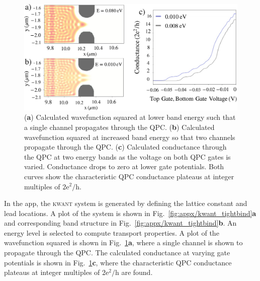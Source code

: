 \begin{figure}[!bht]
 \begin{center}
 \includegraphics[width=1.0\textwidth]{figures/appendix/appendix2_wavefunction.pdf}
 \caption[\textsc{kwant} : Transport Simulation]{\label{fig:appx/kwant_transport} 
 (\textbf{a}) Calculated wavefunction squared at lower band energy such that a single channel propagates through the QPC. (\textbf{b}) Calculated wavefunction squared at increased band energy so that two channels propagate through the QPC. (\textbf{c}) Calculated conductance through the QPC at two energy bands as the voltage on both QPC gates is varied. Conductance drops to zero at lower gate potentials. Both curves show the characteristic QPC conductance plateaus at integer multiples of $\mathrm{2e^2/h}$. }
 \end{center}
\end{figure}


In the app, the \textsc{kwant} system is generated by defining the lattice constant and lead locations. A plot of the system is shown in Fig.~\ref{fig:appx/kwant_tightbind}\textbf{a} and corresponding band structure in Fig.~\ref{fig:appx/kwant_tightbind}\textbf{b}. An energy level is selected to compute transport properties.
A plot of the wavefunction squared is shown in Fig.~\ref{fig:appx/kwant_transport}\textbf{a}, where a single channel is shown to propagate through the QPC. 
The calculated conductance at varying gate potentials is shown in Fig.~\ref{fig:appx/kwant_transport}\textbf{c}, where the characteristic QPC conductance plateaus at integer multiples of $\mathrm{2e^2/h}$ are found. 



